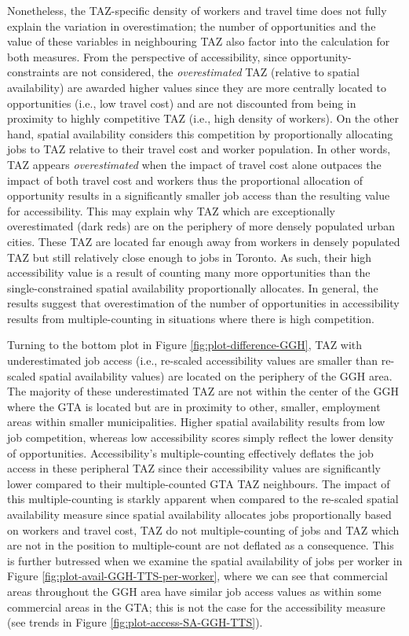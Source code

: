 \documentclass[]{elsarticle} %
\begin{document}
Nonetheless, the TAZ-specific density of workers and travel time does
not fully explain the variation in overestimation; the number of
opportunities and the value of these variables in neighbouring TAZ also
factor into the calculation for both measures. From the perspective of
accessibility, since opportunity-constraints are not considered, the
\emph{overestimated} TAZ (relative to spatial availability) are awarded
higher values since they are more centrally located to opportunities
(i.e., low travel cost) and are not discounted from being in proximity
to highly competitive TAZ (i.e., high density of workers). On the other
hand, spatial availability considers this competition by proportionally
allocating jobs to TAZ relative to their travel cost and worker
population. In other words, TAZ appears \emph{overestimated} when the
impact of travel cost alone outpaces the impact of both travel cost and
workers thus the proportional allocation of opportunity results in a
significantly smaller job access than the resulting value for
accessibility. This may explain why TAZ which are exceptionally
overestimated (dark reds) are on the periphery of more densely populated
urban cities. These TAZ are located far enough away from workers in
densely populated TAZ but still relatively close enough to jobs in
Toronto. As such, their high accessibility value is a result of counting
many more opportunities than the single-constrained spatial availability
proportionally allocates. In general, the results suggest that
overestimation of the number of opportunities in accessibility results
from multiple-counting in situations where there is high competition.

Turning to the bottom plot in Figure \ref{fig:plot-difference-GGH}, TAZ
with underestimated job access (i.e., re-scaled accessibility values are
smaller than re-scaled spatial availability values) are located on the
periphery of the GGH area. The majority of these underestimated TAZ are
not within the center of the GGH where the GTA is located but are in
proximity to other, smaller, employment areas within smaller
municipalities. Higher spatial availability results from low job
competition, whereas low accessibility scores simply reflect the lower
density of opportunities. Accessibility's multiple-counting effectively
deflates the job access in these peripheral TAZ since their
accessibility values are significantly lower compared to their
multiple-counted GTA TAZ neighbours. The impact of this
multiple-counting is starkly apparent when compared to the re-scaled
spatial availability measure since spatial availability allocates jobs
proportionally based on workers and travel cost, TAZ do not
multiple-counting of jobs and TAZ which are not in the position to
multiple-count are not deflated as a consequence. This is further
butressed when we examine the spatial availability of jobs per worker in
Figure \ref{fig:plot-avail-GGH-TTS-per-worker}, where we can see that
commercial areas throughout the GGH area have similar job access values
as within some commercial areas in the GTA; this is not the case for the
accessibility measure (see trends in Figure
\ref{fig:plot-access-SA-GGH-TTS}).
\end{document}
